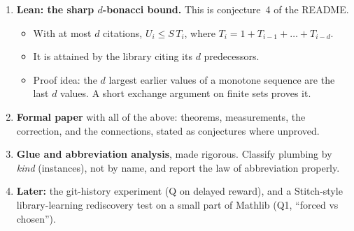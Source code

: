 \documentclass[11pt]{article}
\begin{document}
\begin{enumerate}
\item \textbf{Lean: the sharp $d$-bonacci bound.} This is conjecture~4 of the README.
  \begin{itemize}
  \item With at most $d$ citations, $U_i\le S\,T_i$, where $T_i=1+T_{i-1}+\dots+T_{i-d}$.
  \item It is attained by the library citing its $d$ predecessors.
  \item Proof idea: the $d$ largest earlier values of a monotone sequence are the last $d$
    values. A short exchange argument on finite sets proves it.
  \end{itemize}
\item \textbf{Formal paper} with all of the above: theorems, measurements, the correction,
  and the connections, stated as conjectures where unproved.
\item \textbf{Glue and abbreviation analysis}, made rigorous. Classify plumbing by
  \emph{kind} (instances), not by name, and report the law of abbreviation properly.
\item \textbf{Later:} the git-history experiment (Q on delayed reward), and a Stitch-style
  library-learning rediscovery test on a small part of Mathlib (Q1, ``forced vs chosen'').
\end{enumerate}
\end{document}
